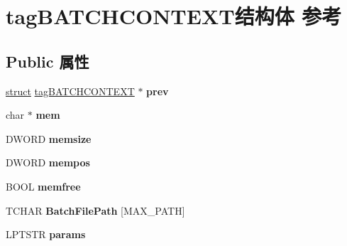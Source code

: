 \hypertarget{structtag_b_a_t_c_h_c_o_n_t_e_x_t}{}\section{tag\+B\+A\+T\+C\+H\+C\+O\+N\+T\+E\+X\+T结构体 参考}
\label{structtag_b_a_t_c_h_c_o_n_t_e_x_t}
\subsection*{Public 属性}
\begin{DoxyCompactItemize}
\item 
\mbox{\label{structtag_b_a_t_c_h_c_o_n_t_e_x_t_ac39be19c403e88ceea3cd1e4a204c8a0}} 
\hyperlink{interfacestruct}{struct} \hyperlink{structtag_b_a_t_c_h_c_o_n_t_e_x_t}{tag\+B\+A\+T\+C\+H\+C\+O\+N\+T\+E\+XT} $\ast$ {\bfseries prev}
\item 
\mbox{\label{structtag_b_a_t_c_h_c_o_n_t_e_x_t_a73b3ce877454f92750636d8bac1e314b}} 
char $\ast$ {\bfseries mem}
\item 
\mbox{\label{structtag_b_a_t_c_h_c_o_n_t_e_x_t_a2562bfe83668d91048c54856c251bafb}} 
D\+W\+O\+RD {\bfseries memsize}
\item 
\mbox{\label{structtag_b_a_t_c_h_c_o_n_t_e_x_t_af5abcaef72ea2f6152ee7acee7a99364}} 
D\+W\+O\+RD {\bfseries mempos}
\item 
\mbox{\label{structtag_b_a_t_c_h_c_o_n_t_e_x_t_a647c3fe142ac927946783e1c0f46e2f5}} 
B\+O\+OL {\bfseries memfree}
\item 
\mbox{\label{structtag_b_a_t_c_h_c_o_n_t_e_x_t_a1c27b4728e3e592c36c6e4aa6f49f28d}} 
T\+C\+H\+AR {\bfseries Batch\+File\+Path} \mbox{[}M\+A\+X\+\_\+\+P\+A\+TH\mbox{]}
\item 
\mbox{\label{structtag_b_a_t_c_h_c_o_n_t_e_x_t_a31362e8c251853970d34d5e3c4fb9770}} 
L\+P\+T\+S\+TR {\bfseries params}
\item 
\mbox{\label{structtag_b_a_t_c_h_c_o_n_t_e_x_t_a1499a347b75dd7782320f5fa8178c728}} 

\end{DoxyCompactItemize}

